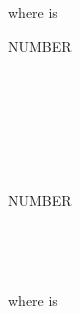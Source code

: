 where  is

\begin{syntax}
  \begin{1=}
    \begin{1+}
       NUMBER
      \begin{1=}
        \identifier \\
        \literal
      \end{1=} \\

      \begin{1=}
         \\
         \\
      \end{1=}
      NUMBER
      \begin{1=}
        \identifier \\
        \literal
      \end{1=}
    \end{1+} \\


  \end{1=}
\end{syntax}

where  is

